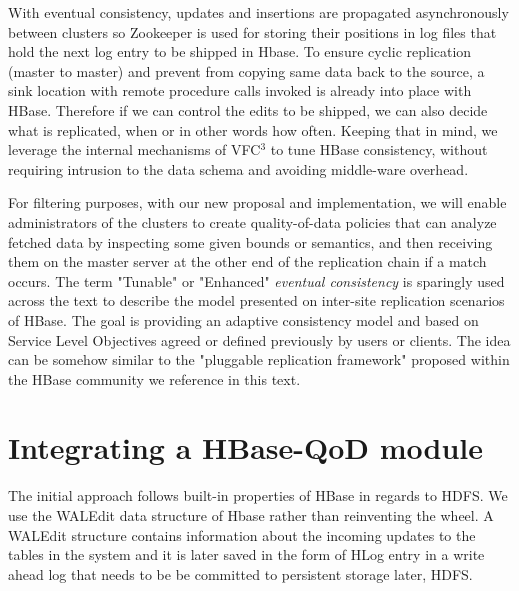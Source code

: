 With eventual consistency, updates and insertions are propagated asynchronously between clusters so Zookeeper is used for storing their positions in log files that hold the next log entry to be shipped in Hbase. To ensure cyclic replication (master to master) and prevent from copying same data back to the source, a sink location with remote procedure calls invoked is already into place with HBase. Therefore if we can control the edits to be shipped, we can also decide what is replicated, when or in other words how often. Keeping that in mind, we leverage the internal mechanisms of VFC$^{3}$ to tune HBase consistency, without requiring intrusion to the data schema and avoiding middle-ware overhead.

For filtering purposes, with our new proposal and implementation, we will enable administrators of the clusters to create quality-of-data policies that can analyze fetched data by inspecting some given bounds or semantics, and then receiving them on the master server at the other end of the replication chain if a match occurs. The term "Tunable" or "Enhanced" \emph{eventual consistency} is sparingly used across the text to describe the model presented on inter-site replication scenarios of HBase. The goal is providing an adaptive consistency model and based on Service Level Objectives agreed or defined previously by users or clients. The idea can be somehow similar to the "pluggable replication framework" proposed within the HBase community we reference in this text.





\section{Integrating a HBase-QoD module}\label{integration}

The initial approach follows built-in properties of HBase in regards to HDFS. We use the WALEdit data structure of Hbase rather than reinventing the wheel. A WALEdit structure contains information about the incoming updates to the tables in the system and it is later saved in the form of HLog entry in a write ahead log that needs to be be committed to persistent storage later, HDFS.

